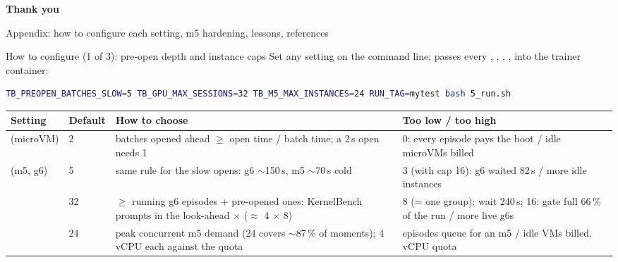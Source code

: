 {
\begin{frame}[plain]
\vfill
{\fontsize{22}{26}\selectfont\bfseries\color{white}Thank you\par}
\vspace{3mm}
{\small\color{inkmuted}\par}
\vspace{2mm}
{\scriptsize\color{inkmuted}Appendix: how to configure each setting, m5 hardening, lessons, references\par}
\vfill
\end{frame}}

\appendix
{}

\begin{frame}[fragile]{How to configure (1 of 3): pre-open depth and instance caps}
{\scriptsize Set any setting on the command line;  passes every , , , ,  into the trainer container:}
\begin{lstlisting}[language=bash]
TB_PREOPEN_BATCHES_SLOW=5 TB_GPU_MAX_SESSIONS=32 TB_M5_MAX_INSTANCES=24 RUN_TAG=mytest bash 5_run.sh
\end{lstlisting}
\scriptsize\setlength{\tabcolsep}{3pt}
\begin{tabularx}{\textwidth}{@{}P{0.24\textwidth}P{0.07\textwidth}YY@{}}
\toprule
\textbf{Setting} & \textbf{Default} & \textbf{How to choose} & \textbf{Too low / too high}\\
\midrule
{}\newline(microVM) & 2 & batches opened ahead $\ge$ open time / batch time; a 2\,s open needs 1 & 0: every episode pays the boot / idle microVMs billed\\
\newline(m5, g6) & 5 & same rule for the slow opens: g6 $\sim$150\,s, m5 $\sim$70\,s cold & 3 (with cap 16): g6 waited 82\,s / more idle instances\\
 & 32 & $\ge$ running g6 episodes + pre-opened ones: KernelBench prompts in the look-ahead $\times$  ($\approx$ 4 $\times$ 8) & 8 (= one group): wait 240\,s; 16: gate full 66\,\% of the run / more live g6s\\
 & 24 & peak concurrent m5 demand (24 covers $\sim$87\,\% of moments); 4 vCPU each against the quota & episodes queue for an m5 / idle VMs billed, vCPU quota\\
\bottomrule
\end{tabularx}
\end{frame}

